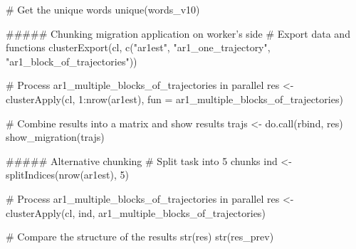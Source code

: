 # Get the unique words
unique(words_v10)



##### Chunking migration application on worker's side
# Export data and functions
clusterExport(cl, c("ar1est", "ar1_one_trajectory", "ar1_block_of_trajectories"))

# Process ar1_multiple_blocks_of_trajectories in parallel
res <- clusterApply(cl, 1:nrow(ar1est), 
                    fun = ar1_multiple_blocks_of_trajectories)
                    
# Combine results into a matrix and show results        
trajs <- do.call(rbind, res)
show_migration(trajs)


##### Alternative chunking
# Split task into 5 chunks
ind <- splitIndices(nrow(ar1est), 5)

# Process ar1_multiple_blocks_of_trajectories in parallel
res <- clusterApply(cl, ind, ar1_multiple_blocks_of_trajectories)

# Compare the structure of the results 
str(res)
str(res_prev)

